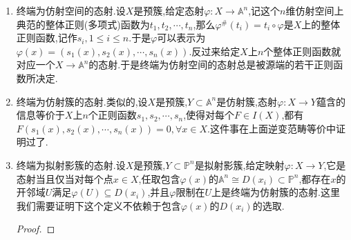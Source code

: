 \begin{enumerate}
\begin{enumerate}
\begin{proof}
    		$f^*$是单射等价于讲对$Y$上任意正则函数$u$都有$f^*(u)=0$,这等价于讲对任意$u$都有$f(X)$中的点都是$u$的零点,但是正则映射的零点集是闭集,所以这等价于讲对任意$u$都有$\overline{f(X)}$落在$u$的零点集,也等价于讲对任意$u$都有$u\in I(\overline{f(X)})$,于是等价于讲$k[Y]=I(\overline{f(X)})$,等价于$\overline{f(X)}=Y$.
    	\end{proof}
    \end{enumerate}
    \item 终端为仿射空间的态射.设$X$是预簇,给定态射$\varphi:X\to\mathbb{A}^n$,记这个$n$维仿射空间上典范的整体正则(多项式)函数为$t_1,t_2,\cdots,t_n$,那么$\varphi^{\#}(t_i)=t_i\circ\varphi$是$X$上的整体正则函数,记作$s_i,1\le i\le n$.于是$\varphi$可以表示为$\varphi(x)=(s_1(x),s_2(x),\cdots,s_n(x))$.反过来给定$X$上$n$个整体正则函数就对应一个$X\to\mathbb{A}^n$的态射.于是终端为仿射空间的态射总是被源端的若干正则函数所决定.
    \item 终端为仿射簇的态射.类似的,设$X$是预簇,$Y\subset\mathbb{A}^n$是仿射簇,态射$\varphi:X\to Y$蕴含的信息等价于$X$上$n$个正则函数$s_1,s_2,\cdots,s_n$,使得对每个$F\in I(X)$,都有$F(s_1(x),s_2(x),\cdots,s_n(x))=0,\forall x\in X$.这件事在上面逆变范畴等价中证明过了.
    \item 终端为拟射影簇的态射.设$X$是预簇,$Y\subset\mathbb{P}^n$是拟射影簇,给定映射$\varphi:X\to Y$,它是态射当且仅当对每个点$x\in X$,任取包含$\varphi(x)$的$\mathbb{A}^n\cong D(x_i)\subset\mathbb{P}^n$,都存在$x$的开邻域$U$满足$\varphi(U)\subseteq D(x_i)$,并且$\varphi$限制在$U$上是终端为仿射簇的态射.这里我们需要证明下这个定义不依赖于包含$\varphi(x)$的$D(x_i)$的选取.
    \begin{proof}
    	

\end{proof}
\end{enumerate}
